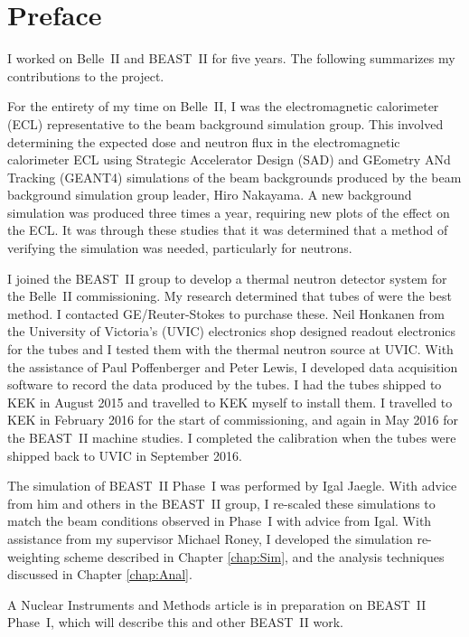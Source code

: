 \chapter*{Preface}


I worked on Belle~II and BEAST~II for five years. The following summarizes my contributions to the project.

For the entirety of my time on Belle~II, I was the electromagnetic calorimeter (ECL) representative to the beam background simulation group. This involved determining the expected dose and neutron flux in the electromagnetic calorimeter ECL using Strategic Accelerator Design (SAD) and GEometry ANd Tracking (GEANT4) simulations of the beam backgrounds produced by the beam background simulation group leader, Hiro Nakayama. A new background simulation was produced three times a year, requiring new plots of the effect on the ECL. It was through these studies that it was determined that a method of verifying the simulation was needed, particularly for neutrons.

I joined the BEAST~II group to develop a thermal neutron detector system for the Belle~II commissioning. My research determined that tubes of \he were the best method. I contacted GE/Reuter-Stokes to purchase these. Neil Honkanen from the University of Victoria's (UVIC) electronics shop designed readout electronics for the \he tubes and I tested them with the thermal neutron source at UVIC. With the assistance of Paul Poffenberger and Peter Lewis, I developed data acquisition software to record the data produced by the tubes. I had the tubes shipped to KEK in August 2015 and travelled to KEK myself to install them. I travelled to KEK in February 2016 for the start of commissioning, and again in May 2016 for the BEAST~II machine studies. I completed the calibration when the \he tubes were shipped back to UVIC in September 2016.  

The simulation of BEAST~II Phase~I was performed by Igal Jaegle. With advice from him and others in the BEAST~II group, I re-scaled these simulations to match the beam conditions observed in Phase~I with advice from Igal. With assistance from my supervisor Michael Roney, I developed the simulation re-weighting scheme described in Chapter \ref{chap:Sim}, and the analysis techniques discussed in Chapter \ref{chap:Anal}.

A Nuclear Instruments and Methods article is in preparation on BEAST~II Phase~I, which will describe this and other BEAST~II work.

